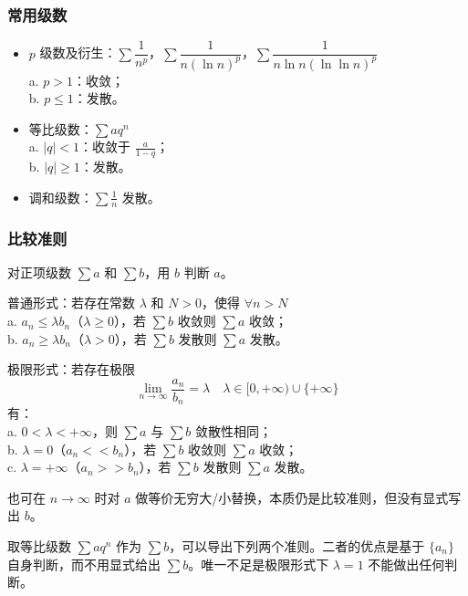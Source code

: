 \documentclass[12pt, a4paper, UTF8, openany]{ctexbook}
\begin{document}
        \subsubsection{常用级数}
        \begin{itemize}
            \item $p$ 级数及衍生：$\sum \dfrac{1}{n^p}$，$\sum \dfrac{1}{n (\ln n)^p}$，$\sum \dfrac{1}{n \ln n (\ln \ln n)^p}$ \\
                a. $p > 1$：收敛；\\
                b. $p \leqslant 1$：发散。
            \item 等比级数：$\sum aq^n$ \\
                a. $|q| < 1$：收敛于 $\frac{a}{1 - q}$；\\
                b. $|q| \geqslant 1$：发散。
            \item 调和级数：$\sum \frac{1}{n}$ 发散。
        \end{itemize}

        \subsubsection{比较准则}
        对正项级数 $\sum a$ 和 $\sum b$，用 $b$ 判断 $a$。
        
        普通形式：若存在常数 $\lambda$ 和 $N > 0$，使得 $\forall n > N$ \\
        a. $a_n \leqslant \lambda b_n$（$\lambda \geqslant 0$），若 $\sum b$ 收敛则 $\sum a$ 收敛；\\
        b. $a_n \geqslant \lambda b_n$（$\lambda > 0$），若 $\sum b$ 发散则 $\sum a$ 发散。

        极限形式：若存在极限
        $$\lim_{n \to \infty} \frac{a_n}{b_n} = \lambda \quad \lambda \in [0, +\infty) \cup \{+\infty\}$$
        有：\\
        a. $0 < \lambda < +\infty$，则 $\sum a$ 与 $\sum b$ 敛散性相同；\\
        b. $\lambda = 0$（$a_n << b_n$），若 $\sum b$ 收敛则 $\sum a$ 收敛；\\
        c. $\lambda = +\infty$（$a_n >> b_n$），若 $\sum b$ 发散则 $\sum a$ 发散。

        也可在 $n \to \infty$ 时对 $a$ 做等价无穷大/小替换，本质仍是比较准则，但没有显式写出 $b$。

        取等比级数 $\sum aq^n$ 作为 $\sum b$，可以导出下列两个准则。二者的优点是基于 $\{a_n\}$ 自身判断，而不用显式给出 $\sum b$。唯一不足是极限形式下 $\lambda = 1$ {\heiti 不能做出任何判断}。
\end{document}
